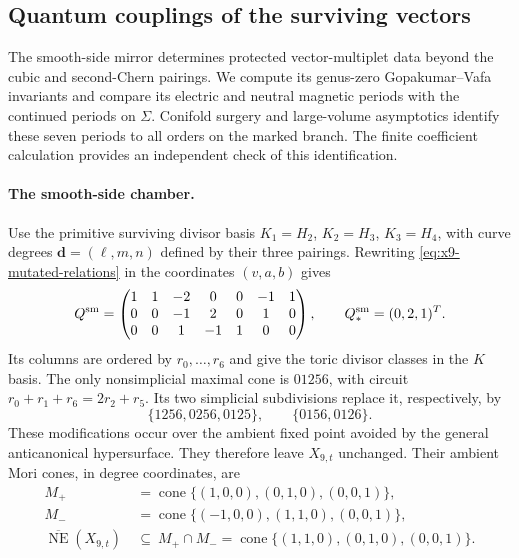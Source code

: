 \subsection{Quantum couplings of the surviving vectors}
\label{subsec:x9-neutral-quantum}

The smooth-side mirror determines protected vector-multiplet data beyond
the cubic and second-Chern pairings. We compute its genus-zero
Gopakumar--Vafa invariants and compare its electric and neutral magnetic
periods with the continued periods on $\Sigma$. Conifold surgery and
large-volume asymptotics identify these seven periods to all orders on
the marked branch. The finite coefficient calculation provides an
independent check of this identification.

\paragraph{The smooth-side chamber.}
Use the primitive surviving divisor basis
$K_1=H_2$, $K_2=H_3$, $K_3=H_4$, with curve degrees
$\mathbf d=(\ell,m,n)$ defined by their three pairings. Rewriting
\eqref{eq:x9-mutated-relations} in the coordinates $(v,a,b)$ gives
\begin{equation}
 Q^{\rm sm}=\begin{pmatrix}
 1&1&-2&0&0&-1&1\\
 0&0&-1&2&0&1&0\\
 0&0&1&-1&1&0&0
 \end{pmatrix},\qquad Q^{\rm sm}_*=(0,2,1)^T.
 \label{eq:x9-neutral-smooth-glsm}
\end{equation}
Its columns are ordered by $r_0,\ldots,r_6$ and give the toric
divisor classes in the $K$ basis. The only nonsimplicial maximal
cone is $01256$, with circuit $r_0+r_1+r_6=2r_2+r_5$.
Its two simplicial subdivisions replace it, respectively, by
\begin{equation}
 \{1256,0256,0125\},\qquad \{0156,0126\}.
 \label{eq:x9-neutral-ambient-subdivisions}
\end{equation}
These modifications occur over the ambient fixed point avoided by
the general anticanonical hypersurface. They therefore leave
$X_{9,t}$ unchanged. Their ambient Mori cones, in degree coordinates,
are
\begin{equation}
 \begin{aligned}
 M_+&=\operatorname{cone}\{(1,0,0),(0,1,0),(0,0,1)\},\\
 M_-&=\operatorname{cone}\{(-1,0,0),(1,1,0),(0,0,1)\},\\
 \overline{\operatorname{NE}}(X_{9,t})\ &\subseteq\ M_+\cap M_-
 =\operatorname{cone}\{(1,1,0),(0,1,0),(0,0,1)\}.
 \end{aligned}
 \label{eq:x9-neutral-common-mori}
\end{equation}

